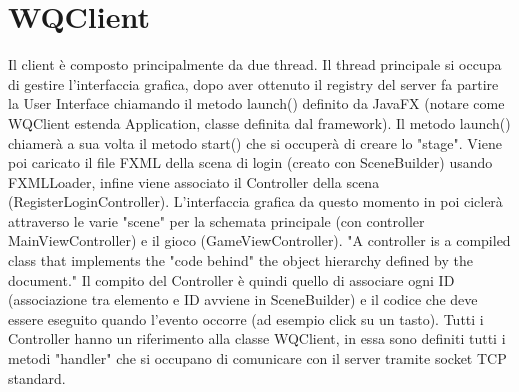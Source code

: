 \documentclass{article}
\begin{document}
\section{WQClient}
Il client è composto principalmente da due thread. Il thread principale si occupa di gestire l'interfaccia grafica, dopo aver ottenuto il registry del server fa partire la User Interface chiamando il metodo launch() definito da JavaFX (notare come WQClient estenda Application, classe definita dal framework). Il metodo launch() chiamerà a sua volta il metodo start() che si occuperà di creare lo "stage". Viene poi caricato il file FXML della scena di login (creato con SceneBuilder) usando FXMLLoader, infine viene associato il Controller della scena (RegisterLoginController). L'interfaccia grafica da questo momento in poi ciclerà attraverso le varie "scene" per la schemata principale (con controller MainViewController) e il gioco (GameViewController). "A controller is a compiled class that implements the "code behind" the object hierarchy defined by the document." \cite{javafxDocumentation} Il compito del Controller è quindi quello di associare ogni ID (associazione tra elemento e ID avviene in SceneBuilder) e il codice che deve essere eseguito quando l'evento occorre (ad esempio click su un tasto). Tutti i Controller hanno un riferimento alla classe WQClient, in essa sono definiti tutti i metodi "handler" che si occupano di comunicare con il server tramite socket TCP standard.
\end{document}
